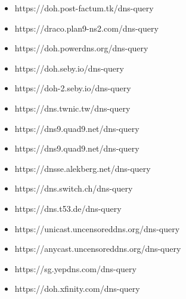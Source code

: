 \begin{itemize}
\item https://doh.post-factum.tk/dns-query
\item https://draco.plan9-ns2.com/dns-query
\item https://doh.powerdns.org/dns-query
\item https://doh.seby.io/dns-query
\item https://doh-2.seby.io/dns-query
\item https://dns.twnic.tw/dns-query
\item https://dns9.quad9.net/dns-query
\item https://dns9.quad9.net/dns-query
\item https://dnsse.alekberg.net/dns-query
\item https://dns.switch.ch/dns-query
\item https://dns.t53.de/dns-query
\item https://unicast.uncensoreddns.org/dns-query
\item https://anycast.uncensoreddns.org/dns-query
\item https://sg.yepdns.com/dns-query
\item https://doh.xfinity.com/dns-query
\end{itemize}
